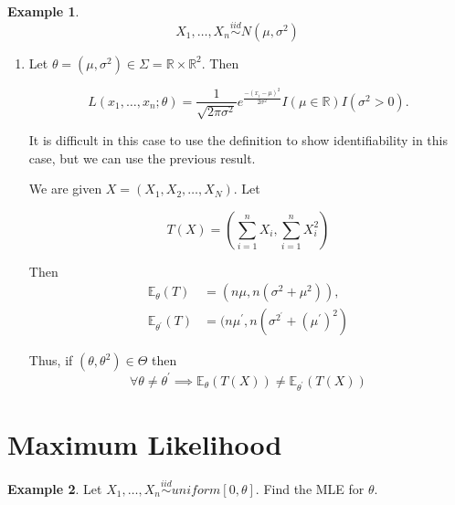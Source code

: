 \documentclass[12pt]{article}
\theoremstyle{definition}
\newtheorem*{example}{Example}
\begin{document}
\begin{example}
\begin{equation*}
X_1, \ldots, X_n \overset{iid}{\sim} N(\mu, \sigma^2)
\end{equation*}

\begin{enumerate}[label = Part \arabic*)]

\item 
Let $\theta = (\mu, \sigma^2) \in \Sigma = \mathbb{R} \times \mathbb{R}^2$. Then

\begin{equation*}
L(x_1, \ldots, x_n; \theta) = \frac{1}{\sqrt{2 \pi \sigma^2}} 
e^{\frac{-(x_i - \mu)^2}{2\sigma^2}} I(\mu \in \mathbb{R})I(\sigma^2 > 0).
\end{equation*}

It is difficult in this case to use the definition to show identifiability
in this case, but we can use the previous result.

We are given $X = (X_1, X_2, \dots, X_N)$. Let 

\begin{equation*}
T(X) = \left( \sum_{i = 1}^n X_i,  \sum^n_{i = 1} X_i^2 \right)
\end{equation*}

Then 
\begin{align*}
\mathbb{E}_{\theta}(T) &= (n \mu, n(\sigma^2 + \mu^2)),\\
\mathbb{E}_{\theta^{\prime}}(T) &= (n \mu^{\prime}, n(\sigma^{2^{\prime}} + (\mu^{\prime})^2) 
\end{align*}

Thus, if $(\theta, \theta^2) \in \Theta$ then
\begin{equation*}
\forall \theta \neq \theta^{\prime} \implies \mathbb{E}_{\theta}(T(X)) \neq \mathbb{E}_{\theta^{\prime}}(T(X))
\end{equation*}
\end{enumerate}
\end{example}


\section{Maximum Likelihood}

\begin{example}
Let $X_1, \ldots, X_n \overset{iid}{\sim} uniform[0,\theta]$. Find the MLE for $\theta$.
\end{example}
\end{document}

